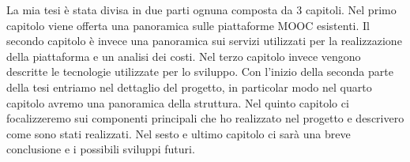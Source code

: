

La mia tesi è stata divisa in due parti ognuna composta da 3 capitoli.
Nel primo capitolo viene offerta una panoramica sulle piattaforme MOOC esistenti.
Il secondo capitolo è invece una panoramica sui servizi utilizzati per la realizzazione della piattaforma e un analisi dei costi.
Nel terzo capitolo invece vengono descritte le tecnologie utilizzate per lo sviluppo.
Con l'inizio della seconda parte della tesi entriamo nel dettaglio del progetto, in particolar modo nel quarto capitolo avremo una panoramica della struttura.
Nel quinto capitolo ci focalizzeremo sui componenti principali che ho realizzato nel progetto e descrivero come sono stati realizzati.
Nel sesto e ultimo capitolo ci sarà una breve conclusione e i possibili sviluppi futuri.
